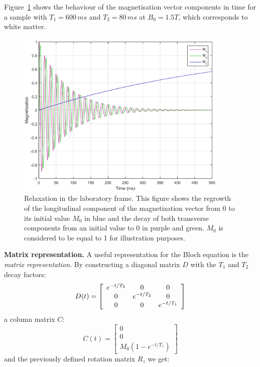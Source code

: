 Figure~\ref{fig:ch4MxMyMz} shows the behaviour of the magnetisation vector components in time for a sample with $T_1 = 600 \, ms$ and $T_2 = 80 \, ms$ at $B_0 = 1.5T$, which corresponds to white matter.

\begin{figure}[ht]
    \centering
    \includegraphics[width=0.9\textwidth,keepaspectratio]{images/mri/ch4MxMyMz}
    \caption{Relaxation in the laboratory frame. This figure shows the regrowth of the longitudinal component of the magnetization vector from 0 to its initial value $M_0$ in blue and the decay of both transverse components from an initial value to 0 in purple and green. $M_0$ is considered to be equal to 1 for illustration purposes.}
    \label{fig:ch4MxMyMz}
\end{figure}

\hfill

\textbf{Matrix representation.} A useful representation for the Bloch equation is the \textit{matrix representation}.
By constructing a diagonal matrix $D$ with the $T_1$ and $T_2$ decay factors:
\begin{equation}
    D ( t ) = \left[
    \begin{array}{c c c}
          e^{-t/T_2} &     0      &     0 \\
              0      & e^{-t/T_2} &     0 \\
              0      &     0      & e^{-t/T_1}
    \end{array}
    \right]
\end{equation}
a column matrix $C$:
\begin{equation}
    C ( t ) = \left[
    \begin{array}{c}
        0 \\
        0 \\
    M_0(1 - e^{-t/T_1})
    \end{array}
    \right]
\end{equation}
and the previously defined rotation matrix $R_z$ we get:


